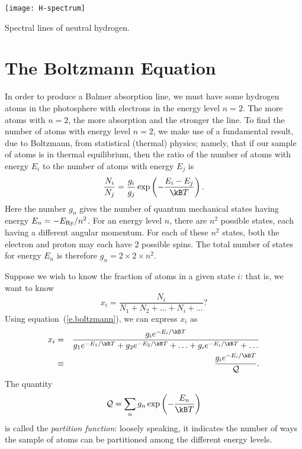 \begin{marginfigure}[-8\baselineskip]
\texttt{[image: H-spectrum]}
\caption{Spectral lines of neutral hydrogen. 
\label{f.H-spectrum}}
\end{marginfigure}

\section{The Boltzmann Equation}
\label{s.boltzmann-eqn}

In order to produce a Balmer absorption line, we must have some hydrogen atoms in the photosphere with electrons in the energy level $n=2$. The more atoms with $n=2$, the more absorption and the stronger the line. To find the number of atoms with energy level $n=2$, we make use of a fundamental result, due to Boltzmann, from statistical (thermal) physics; namely, that if our sample of atoms is in thermal equilibrium, then the ratio of the number of atoms with energy $E_{i}$ to the number of atoms with energy $E_{j}$ is
\begin{equation}\label{e.boltzmann}
\frac{N_{i}}{N_{j}} = \frac{g_{i}}{g_{j}} 
\exp\left(-\frac{E_{i}-E_{j}}{\kB T}\right).
\end{equation}
Here the number $g_{n}$ gives the number of quantum mechanical states having energy $E_{n} = -E_{\mathrm{Ry}}/n^{2}$. For an energy level $n$, there are $n^{2}$ possible states, each having a different angular momentum. For each of these $n^{2}$ states, both the electron and proton may each have 2 possible spins. The total number of states for energy $E_{n}$ is therefore $g_{n} = 2\times2\times n^{2}$.

Suppose we wish to know the fraction of atoms in a given state $i$: that is, we want to know
\[	x_{i} = \frac{N_{i}}{N_{1}+N_{2}+\ldots+N_{i}+\ldots} ? \]
Using equation~(\ref{e.boltzmann}), we can express $x_{i}$ as 
\begin{eqnarray}
  x_{i} &=& \frac{g_{i}e^{-E_{i}/\kB T}}{g_{1}e^{-E_{1}/\kB T}+g_{2}e^{-E_{2}/\kB T}+\ldots+g_{i}e^{-E_{i}/\kB T}+\ldots} \nonumber\\
        &\equiv& \frac{g_{i}e^{-E_{i}/\kB T}}{\pfcn}.
\end{eqnarray}
The quantity 
\begin{equation}\label{e.partition-function}
	\pfcn = \sum_{n} g_{n}\exp\left(-\frac{E_{n}}{\kB T}\right)
\end{equation}
is called the \emph{partition function}: loosely speaking, it indicates the number of ways the sample of atoms can be partitioned among the different energy levels.


